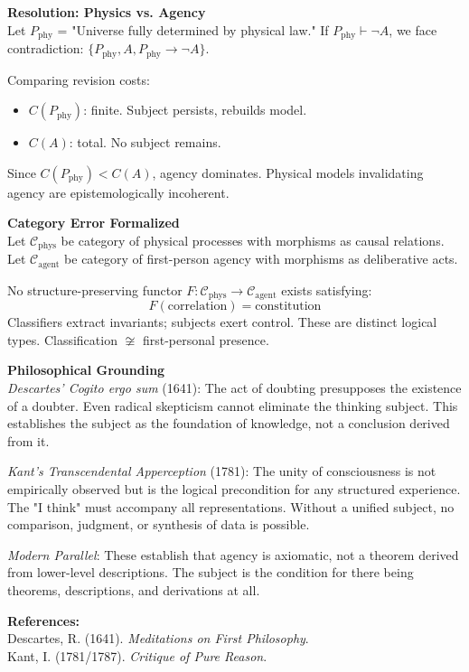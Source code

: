 \begin{technical}
\textbf{Resolution: Physics vs. Agency}\\[0.1em]
Let $P_{\text{phy}}$ = "Universe fully determined by physical law." If $P_{\text{phy}} \vdash \neg A$, we face contradiction: $\{P_{\text{phy}}, A, P_{\text{phy}} \to \neg A\}$.

Comparing revision costs:
\begin{itemize}[leftmargin=*,topsep=0pt,itemsep=1pt]
    \item $C(P_{\text{phy}})$: finite. Subject persists, rebuilds model.
    \item $C(A)$: total. No subject remains.
\end{itemize}

Since $C(P_{\text{phy}}) < C(A)$, agency dominates. Physical models invalidating agency are epistemologically incoherent.

\textbf{Category Error Formalized}\\[0.1em]
Let $\mathcal{C}_{\text{phys}}$ be category of physical processes with morphisms as causal relations. Let $\mathcal{C}_{\text{agent}}$ be category of first-person agency with morphisms as deliberative acts.

No structure-preserving functor $F: \mathcal{C}_{\text{phys}} \to \mathcal{C}_{\text{agent}}$ exists satisfying:
\[
F(\text{correlation}) = \text{constitution}
\]
Classifiers extract invariants; subjects exert control. These are distinct logical types. Classification $\not\cong$ first-personal presence.

\textbf{Philosophical Grounding}\\[0.1em]
\textit{Descartes' Cogito ergo sum} (1641): The act of doubting presupposes the existence of a doubter. Even radical skepticism cannot eliminate the thinking subject. This establishes the subject as the foundation of knowledge, not a conclusion derived from it.

\textit{Kant's Transcendental Apperception} (1781): The unity of consciousness is not empirically observed but is the logical precondition for any structured experience. The "I think" must accompany all representations. Without a unified subject, no comparison, judgment, or synthesis of data is possible.

\textit{Modern Parallel}: These establish that agency is axiomatic, not a theorem derived from lower-level descriptions. The subject is the condition for there being theorems, descriptions, and derivations at all.

\vspace{0.2em}
\textbf{References:}\\
{\footnotesize
Descartes, R. (1641). \textit{Meditations on First Philosophy}.\\
Kant, I. (1781/1787). \textit{Critique of Pure Reason}.
}
\end{technical}

